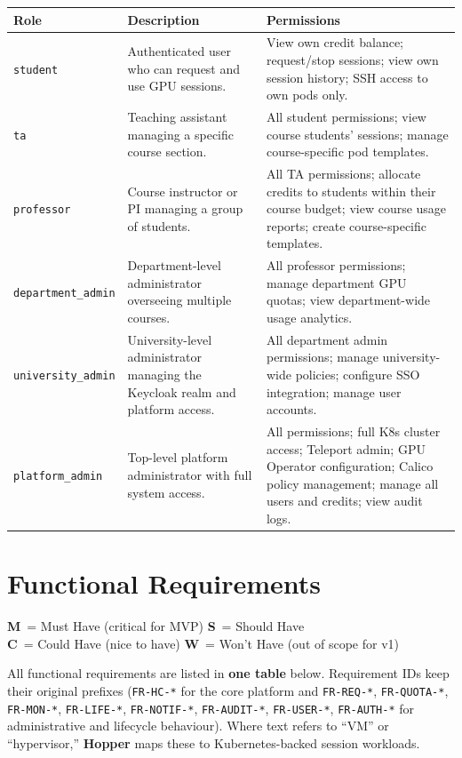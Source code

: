 \documentclass[12pt,a4paper]{article}
\newcommand{\Must}{\textcolor{dangered}{\textbf{M}}}
\newcommand{\Should}{\textcolor{warningyellow}{\textbf{S}}}
\newcommand{\Could}{\textcolor{successgreen}{\textbf{C}}}
\newcommand{\Wont}{\textcolor{hoppergray}{\textbf{W}}}
\begin{document}
\begin{tabularx}{\textwidth}{@{}L{3.5cm}L{5cm}X@{}}
  
  \textbf{Role} & \textbf{Description} & \textbf{Permissions} \\
  \midrule
   \texttt{student}
    & Authenticated user who can request and use GPU sessions.
    & View own credit balance; request/stop sessions; view own session history; SSH access to own pods only. \\
  \texttt{ta}
    & Teaching assistant managing a specific course section.
    & All student permissions; view course students' sessions; manage course-specific pod templates. \\
   \texttt{professor}
    & Course instructor or PI managing a group of students.
    & All TA permissions; allocate credits to students within their course budget; view course usage reports; create course-specific templates. \\
  \texttt{department\_admin}
    & Department-level administrator overseeing multiple courses.
    & All professor permissions; manage department GPU quotas; view department-wide usage analytics. \\
   \texttt{university\_admin}
    & University-level administrator managing the Keycloak realm and platform access.
    & All department admin permissions; manage university-wide policies; configure SSO integration; manage user accounts. \\
  \texttt{platform\_admin}
    & Top-level platform administrator with full system access.
    & All permissions; full K8s cluster access; Teleport admin; GPU Operator configuration; Calico policy management; manage all users and credits; view audit logs. \\
  
\end{tabularx}

\newpage
\section{Functional Requirements}

\begin{notebox}
  \Must\ = Must Have (critical for MVP) \quad
  \Should\ = Should Have \quad \\
  \Could\ = Could Have (nice to have) \quad
  \Wont\ = Won't Have (out of scope for v1)
\end{notebox}

\noindent All functional requirements are listed in \textbf{one table} below. Requirement IDs keep their original prefixes (\texttt{FR-HC-*} for the core platform and \texttt{FR-REQ-*}, \texttt{FR-QUOTA-*}, \texttt{FR-MON-*}, \texttt{FR-LIFE-*}, \texttt{FR-NOTIF-*}, \texttt{FR-AUDIT-*}, \texttt{FR-USER-*}, \texttt{FR-AUTH-*} for administrative and lifecycle behaviour). Where text refers to ``VM'' or ``hypervisor,'' \textbf{Hopper} maps these to Kubernetes-backed session workloads.
\end{document}
